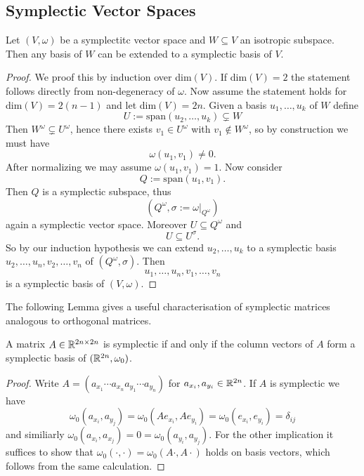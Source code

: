 \subsection{Symplectic Vector Spaces}

\begin{lemma}
    Let $(V,\omega)$ be a symplectitc vector space and $W \subseteq V$ an isotropic subspace. Then any basis of $W$ can be extended to a symplectic basis of $V$.
\end{lemma}
\begin{proof}
    We proof this by induction over dim$(V)$. If dim$(V) = 2$ the statement follows directly from non-degeneracy of $\omega$. Now assume the statement holds for dim$(V) = 2(n-1)$ and let dim$(V) = 2n$. Given a basis $u_1,\ldots,u_k$ of $W$ define 
    \[
    U:= \mathrm{span}(u_2,\ldots,u_k) \subsetneq W
    \]
    Then $W^\omega \subsetneq U^\omega$, hence there exists $v_1 \in U^\omega$ with $v_1 \notin W^\omega$, so by construction we must have 
    \[
    \omega(u_1,v_1) \neq 0.
    \]
    After normalizing we may assume $\omega(u_1,v_1) = 1$. Now consider 
    \[
    Q := \mathrm{span}(u_1,v_1).
    \]
    Then $Q$ is a symplectic subspace, thus 
    \[
    (Q^\omega, \sigma := \omega|_{Q^\omega})
    \]
    again a symplectic vector space. Moreover $U \subseteq Q^\omega$ and
    \[
    U \subseteq U^\sigma.
    \]
    So by our induction hypothesis we can extend $u_2, \ldots, u_k$ to a symplectic basis $u_2,\ldots, u_n, v_2,\ldots,v_n$ of $(Q^\omega, \sigma)$. Then 
    \[
    u_1,\ldots,u_n,v_1,\ldots,v_n
    \] 
    is a symplectic basis of $(V,\omega)$.
\end{proof}

The following Lemma gives a useful characterisation of symplectic matrices analogous to orthogonal matrices.

\begin{lemma}
    A matrix $A \in \mathbb{R}^{2n \times 2n}$ is symplectic if and only if the column vectors of $A$ form a symplectic basis of $(\mathbb{R}^{2n}, \omega_0)$.
\end{lemma}
\begin{proof}
    Write $A = (a_{x_1} \cdots a_{x_n} a_{y_1} \cdots a_{y_n})$ for $a_{x_i}, a_{y_i} \in \mathbb{R}^{2n}$. If $A$ is symplectic we have 
    \[
    \omega_0(a_{x_i}, a_{y_j}) = \omega_0(Ae_{x_i},Ae_{y_i}) = \omega_0(e_{x_i},e_{y_i}) = \delta_{ij}
    \]
    and similiarly $\omega_0(a_{x_i}, a_{x_j}) = 0 = \omega_0(a_{y_i}, a_{y_j})$. For the other implication it suffices to show that $\omega_0(\cdot,\cdot) = \omega_0(A\cdot,A\cdot)$ holds on basis vectors, which follows from the same calculation.
\end{proof}